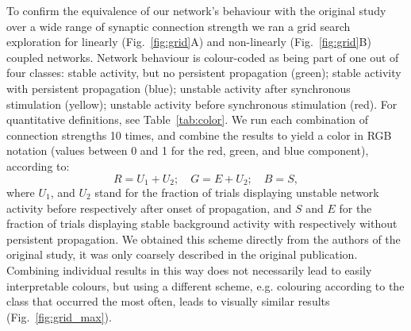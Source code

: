\documentclass[10pt,a4paper,onecolumn]{article}
\begin{document}
To confirm the equivalence of our network's behaviour with the original study over a wide range of synaptic connection strength we ran a grid search exploration for linearly (Fig.~\ref{fig:grid}A) and non-linearly (Fig.~\ref{fig:grid}B) coupled networks. Network behaviour is colour-coded as being part of one out of four classes: stable activity, but no persistent propagation (green); stable activity with persistent propagation (blue); unstable activity after synchronous stimulation (yellow); unstable activity before synchronous stimulation (red). For quantitative definitions, see Table~\ref{tab:color}. We run each combination of connection strengths 10 times, and combine the results to yield a color in RGB notation (values between 0 and 1 for the red, green, and blue component), according to:
\begin{equation}
R = U_1 + U_2;\quad G = E + U_2;\quad B = S,
\end{equation}
where $U_1$, and $U_2$ stand for the fraction of trials displaying unstable network activity before respectively after onset of propagation, and $S$ and $E$ for the fraction of trials displaying stable background activity with respectively without persistent propagation. We obtained this scheme directly from the authors of the original study, it was only coarsely described in the original publication. Combining individual results in this way does not necessarily lead to easily interpretable colours, but using a different scheme, e.g. colouring according to the class that occurred the most often, leads to visually similar results (Fig.~\ref{fig:grid_max}).
\end{document}
